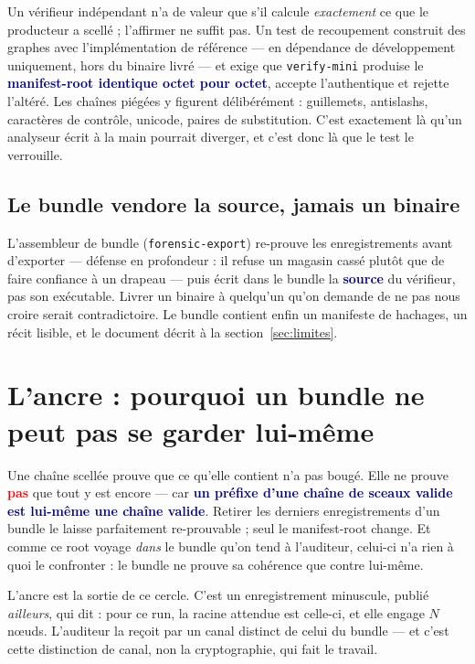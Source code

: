 \documentclass[10pt]{article}
\newcommand{\code}[1]{\texttt{\small #1}}
\newcommand{\mm}[1]{\textbf{\textcolor{navy}{#1}}}
\newcommand{\ko}[1]{\textcolor{red}{\textbf{#1}}}
\begin{document}
Un vérifieur indépendant n'a de valeur que s'il calcule \emph{exactement} ce que le producteur a scellé ; l'affirmer ne suffit pas. Un test de recoupement construit des graphes avec l'implémentation de référence — en dépendance de développement uniquement, hors du binaire livré — et exige que \code{verify-mini} produise le \mm{manifest-root identique octet pour octet}, accepte l'authentique et rejette l'altéré. Les chaînes piégées y figurent délibérément : guillemets, antislashs, caractères de contrôle, unicode, paires de substitution. C'est exactement là qu'un analyseur écrit à la main pourrait diverger, et c'est donc là que le test le verrouille.

\subsection{Le bundle vendore la source, jamais un binaire}

L'assembleur de bundle (\code{forensic-export}) re-prouve les enregistrements avant d'exporter — défense en profondeur : il refuse un magasin cassé plutôt que de faire confiance à un drapeau — puis écrit dans le bundle la \mm{source} du vérifieur, pas son exécutable. Livrer un binaire à quelqu'un qu'on demande de ne pas nous croire serait contradictoire. Le bundle contient enfin un manifeste de hachages, un récit lisible, et le document décrit à la section~\ref{sec:limites}.

\section{L'ancre : pourquoi un bundle ne peut pas se garder lui-même}

\begin{alerte}
Une chaîne scellée prouve que ce qu'elle contient n'a pas bougé. Elle ne prouve \ko{pas} que tout y est encore — car \mm{un préfixe d'une chaîne de sceaux valide est lui-même une chaîne valide}. Retirer les derniers enregistrements d'un bundle le laisse parfaitement re-prouvable ; seul le manifest-root change. Et comme ce root voyage \emph{dans} le bundle qu'on tend à l'auditeur, celui-ci n'a rien à quoi le confronter : le bundle ne prouve sa cohérence que contre lui-même.
\end{alerte}

L'ancre est la sortie de ce cercle. C'est un enregistrement minuscule, publié \emph{ailleurs}, qui dit : pour ce run, la racine attendue est celle-ci, et elle engage $N$ nœuds. L'auditeur la reçoit par un canal distinct de celui du bundle — et c'est cette distinction de canal, non la cryptographie, qui fait le travail.
\end{document}

